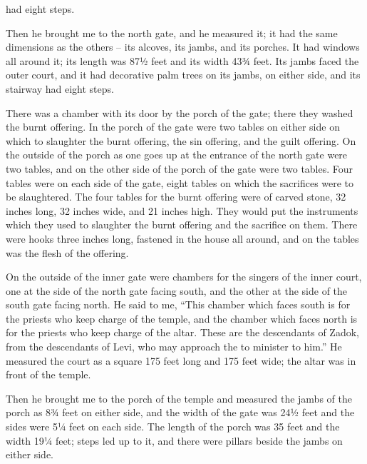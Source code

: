 {had eight
steps.
\par }{\PP {}Then he brought
me to
the north
gate,
and he measured
it; it had the same dimensions
as the others –
its alcoves,
its jambs,
and its porches.
It had windows
all
around
it; its length
was 87½ feet
and its width
43¾
feet.
Its jambs
faced the outer
court,
and it had decorative palm trees
on
its jambs,
on either side,
and its stairway
had eight
steps.
\par }{\PP {}There was a chamber
with its door
by the porch
of the gate;
there
they washed
the burnt offering.
In the porch
of the gate
were two
tables
on either side
on which to slaughter
the burnt offering,
the sin offering,
and the guilt offering.
On
the outside
of the porch as one goes up
at the entrance
of the north
gate
were two
tables,
and on
the other
side
of the porch
of the gate
were two
tables.
Four
tables
were on each side
of the gate,
eight
tables
on which the sacrifices were to
be slaughtered.
The four
tables
for the burnt offering
were of carved
stone,
32 inches
long,
32 inches
wide,
and 21 inches
high.
They would put
the
instruments
which
they used to slaughter
the
burnt offering
and the sacrifice on them.
There were hooks
three inches long,
fastened
in the house
all around,
and on
the tables
was the flesh
of the offering.
\par }{\PP {}On the outside
of the inner
gate
were chambers
for the singers
of the inner
court,
one at
the side
of the north
gate
facing
south,
and the other
at
the side
of the south
gate
facing
north.
He said
to me,
“This
chamber
which
faces
south
is for the priests
who keep
charge
of the temple,
and the chamber
which
faces
north
is for the priests
who keep
charge
of the altar.
These
are the descendants
of Zadok,
from the descendants
of Levi,
who may approach
the {}
to minister to him.”
He measured
the court
as a square
175
feet long
and 175 feet
wide;
the altar
was in front
of the temple.
\par }{\PP {}Then he brought
me to
the porch
of the temple
and measured
the jambs
of the porch
as 8¾ feet
on either side,
and the width
of the gate
was 24½ feet
and the sides
were 5¼ feet
on each side.
The length
of the porch
was 35 feet
and the width
19¼ feet;
steps
led up
to
it, and there were pillars
beside
the jambs
on either side.

}
